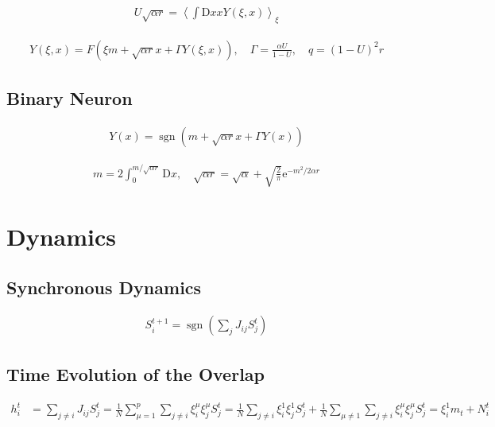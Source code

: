 \documentclass{article}
\begin{document}
\begin{align*}
U \sqrt{\alpha r} = \left\langle \int \mathrm{D}x x Y(\xi, x) \right\rangle_{\xi}\tag{7.55}
\end{align*}

\begin{align*}
Y(\xi, x) = F\left( \xi m + \sqrt{\alpha r} x + \Gamma Y(\xi, x) \right), \quad \Gamma = \frac{\alpha U}{1 - U}, \quad q = (1 - U)^2 r\tag{7.56}
\end{align*}

\subsection{Binary Neuron}

\begin{align*}
Y(x) = \operatorname{sgn}(m + \sqrt{\alpha r} x + \Gamma Y(x))\tag{7.57}
\end{align*}

\begin{align*}
m = 2 \int_0^{m / \sqrt{\alpha r}} \mathrm{D}x, \quad \sqrt{\alpha r} = \sqrt{\alpha} + \sqrt{\frac{2}{\pi}} \mathrm{e}^{-m^2 / 2 \alpha r}\tag{7.58}
\end{align*}

\clearpage

\section{Dynamics}

\subsection{Synchronous Dynamics}

\begin{align*}
S_i^{t+1} = \operatorname{sgn}\left( \sum_j J_{ij} S_j^t \right)\tag{7.59}
\end{align*}

\subsection{Time Evolution of the Overlap}

\begin{align*}
h_i^t &= \sum_{j \neq i} J_{ij} S_j^t = \frac{1}{N} \sum_{\mu=1}^{p} \sum_{j \neq i} \xi_i^\mu \xi_j^\mu S_j^t = \frac{1}{N} \sum_{j \neq i} \xi_i^1 \xi_j^1 S_j^t + \frac{1}{N} \sum_{\mu \neq 1} \sum_{j \neq i} \xi_i^\mu \xi_j^\mu S_j^t = \xi_i^1 m_t + N_i^t\tag{7.60}
\end{align*}
\end{document}
